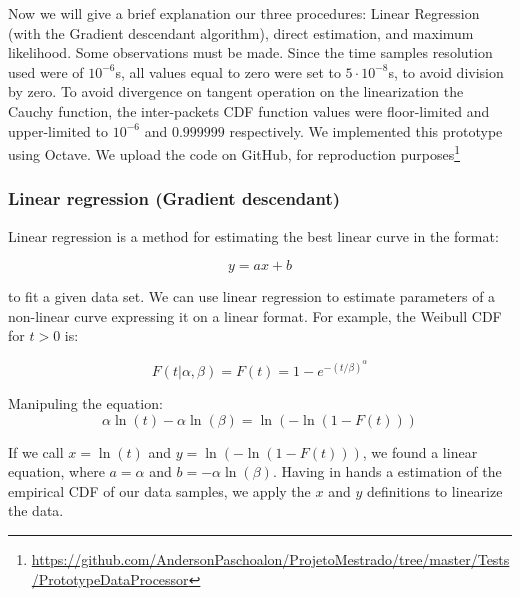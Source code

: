 Now we will give a brief explanation our three procedures: Linear Regression (with the  Gradient descendant algorithm), direct estimation, and maximum likelihood. Some observations must be made. Since the time samples resolution used were of $10^{-6}$s, all values equal to zero were set to  $5\cdot10^{-8}$s, to avoid division by zero. To avoid divergence on tangent operation on the linearization the Cauchy function, the inter-packets CDF function values were floor-limited and upper-limited to  $10^{-6}$ and $0.999999$ respectively. We implemented this prototype using Octave. We upload the code on GitHub, for reproduction purposes\footnote{\href{https://github.com/AndersonPaschoalon/ProjetoMestrado/tree/master/Tests/PrototypeDataProcessor}{https://github.com/AndersonPaschoalon/ProjetoMestrado/tree/master/Tests/PrototypeDataProcessor}}





\subsubsection{Linear regression (Gradient descendant)}

Linear regression is a method for estimating the best linear curve in the format:

\begin{equation}
y = ax + b
\end{equation}

to fit a given data set. We can use linear regression to estimate parameters of a non-linear curve expressing it on a linear format. For example, the Weibull CDF for $t > 0$ is:

\begin{equation}
F(t|\alpha, \beta) = F(t) = 1 - e^{-(t/\beta)^{\alpha}}
\end{equation}

Manipuling the equation:
\begin{equation}
\alpha\ln{(t)} - \alpha\ln{(\beta)} = \ln{(-\ln{(1 - F(t))})}
\end{equation}

If we call $x = \ln{(t)}$ and $y = \ln{(-\ln{(1 - F(t))})}$, we found a linear equation, where $a = \alpha$ and $b = -\alpha\ln{(\beta)}$. Having in hands a estimation of the empirical CDF of our data samples, we apply the $x$ and $y$ definitions to linearize the data. 

